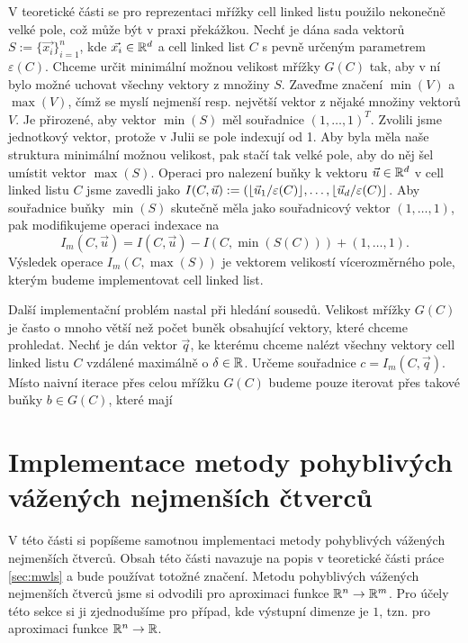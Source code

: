 V teoretické části se pro reprezentaci mřížky cell linked listu použilo nekonečně velké pole, což může být v praxi překážkou. Nechť je dána sada vektorů $S := \{\vec{x_i}\}_{i=1}^n$, kde $\vec{x_i} \in \mathbb{R}^d$ a cell linked list $C$ s pevně určeným parametrem $\varepsilon(C)$. Chceme určit minimální možnou velikost mřížky $G(C)$ tak, aby v ní bylo možné uchovat všechny vektory z množiny $S$. Zaveďme značení $\min(V)$ a $\max(V)$, čímž se myslí nejmenší resp. největší vektor z nějaké množiny vektorů $V$. Je přirozené, aby vektor $\min(S)$ měl souřadnice $(1, \ldots, 1)^T$. Zvolili jsme jednotkový vektor, protože v Julii se pole indexují od 1. Aby byla měla naše struktura minimální možnou velikost, pak stačí tak velké pole, aby do něj šel umístit vektor $\max(S)$. Operaci pro nalezení buňky k vektoru $\vec{u} \in \mathbb{R}^d$ v cell linked listu $C$ jsme zavedli jako $I(C, \vec{u}) := (\lfloor\vec{u}_1/\varepsilon(C)\rfloor, \ldots, \lfloor\vec{u}_d/\varepsilon(C)\rfloor$. Aby souřadnice buňky $\min(S)$ skutečně měla jako souřadnicový vektor $(1, \ldots, 1)$, pak modifikujeme operaci indexace na
\begin{equation}
  \label{cll-index}
  I_m(C, \vec{u}) = I(C, \vec{u}) - I(C, \min(S(C))) + (1, \ldots, 1).
\end{equation}
Výsledek operace $I_m(C, \max(S))$ je vektorem velikostí vícerozměrného pole, kterým budeme implementovat cell linked list.

Další implementační problém nastal při hledání sousedů. Velikost mřížky $G(C)$ je často o mnoho větší než počet buněk obsahující vektory, které chceme prohledat. Nechť je dán vektor $\vec{q}$, ke kterému chceme nalézt všechny vektory cell linked listu $C$ vzdálené maximálně o $\delta \in \mathbb{R}$. Určeme souřadnice $c = I_m(C, \vec{q})$. Místo naivní iterace přes celou mřížku $G(C)$ budeme pouze iterovat přes takové buňky $b \in G(C)$, které mají 

\section{Implementace metody pohyblivých vážených nejmenších čtverců}

V této části si popíšeme samotnou implementaci metody pohyblivých vážených nejmenších čtverců. Obsah této části navazuje na popis v teoretické části práce \ref{sec:mwls} a bude používat totožné značení. Metodu pohyblivých vážených nejmenších čtverců jsme si odvodili pro aproximaci funkce $\mathbb{R}^n \rightarrow \mathbb{R}^m$. Pro účely této sekce si ji zjednodušíme pro případ, kde výstupní dimenze je $1$, tzn. pro aproximaci funkce $\mathbb{R}^n \rightarrow \mathbb{R}$. 

